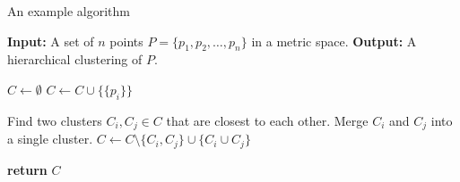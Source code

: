 
\begin{algorithm}
    \caption{An example algorithm}
    \label{alg:example}
    \begin{algorithmic}

        \STATE \textbf{Input:} A set of $n$ points $P = \{p_1, p_2, \ldots, p_n\}$ in a metric space.
        \STATE \textbf{Output:} A hierarchical clustering of $P$.

        \STATE $C \leftarrow \emptyset$
        \STATE $C \leftarrow C \cup \{ \{p_i\} \}$
        \ENDFOR

        \STATE Find two clusters $C_i, C_j \in C$ that are closest to each other.
        \STATE Merge $C_i$ and $C_j$ into a single cluster.
        \STATE $C \leftarrow C \setminus \{C_i, C_j\} \cup \{C_i \cup C_j\}$
        \ENDWHILE

        \STATE \textbf{return} $C$

    \end{algorithmic}
\end{algorithm}
